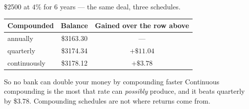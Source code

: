 \documentclass[aspectratio=169, 11pt]{beamer}
\begin{document}
\begin{frame}[t, plain]
  \begin{center}
    {\footnotesize \$2500 at $4\%$ for $6$ years --- the same deal, three schedules.}
  \end{center}
  \vspace{6pt}
  \begin{center}
    \footnotesize
    \renewcommand{\arraystretch}{1.4}
    \begin{tabular}{|l|c|c|}
    \hline
    \textbf{Compounded} & \textbf{Balance} & \textbf{Gained over the row above} \\
    \hline
    annually     & \$3163.30 & --- \\
    quarterly    & \$3174.34 & $+\$11.04$ \\
    continuously & \$3178.12 & $+\$3.78$ \\
    \hline
    \end{tabular}
  \end{center}
  \vspace{8pt}
  \begin{center}
    \begin{minipage}{0.84\textwidth}
      \begin{block}{So no bank can double your money by compounding faster}
        \footnotesize Continuous compounding is the most that rate can \emph{possibly} produce, and it
        beats quarterly by \$3.78. Compounding schedules are not where returns come from.
      \end{block}
    \end{minipage}
  \end{center}
\end{frame}
\end{document}
